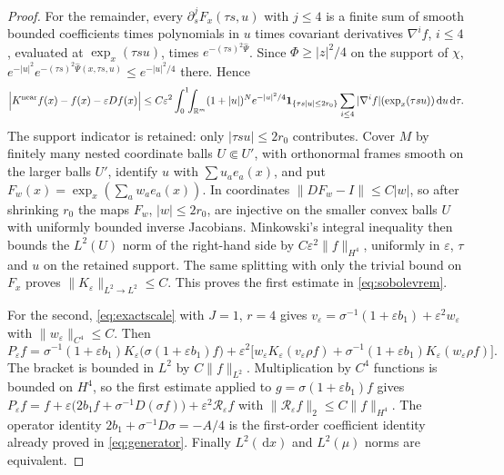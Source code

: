 \documentclass[11pt,a4paper]{article}
\theoremstyle{definition}\newtheorem{definition}[theorem]{Definition}
\theoremstyle{remark}\newtheorem{remark}[theorem]{Remark}
\newcommand{\eps}{\varepsilon}
\newcommand{\dd}{\,\mathrm d}
\newcommand{\R}{\mathbb R}
\newcommand{\norm}[1]{\lVert #1\rVert}
\begin{document}
\begin{proof}
For the remainder, every $\partial_s^jF_x(\tau s,u)$ with $j\le4$ is a finite sum of smooth bounded coefficients times polynomials in $u$ times covariant derivatives $\nabla^if$, $i\le4$, evaluated at $\exp_x(\tau su)$, times $e^{-(\tau s)^2\widehat\Psi}$. Since $\Phi\geq|z|^2/4$ on the support of $\chi$, $e^{-|u|^2}e^{-(\tau s)^2\widehat\Psi(x,\tau s,u)}\leq e^{-|u|^2/4}$ there. Hence
\[
\Bigl|K^{\rm near}f(x)-f(x)-\eps Df(x)\Bigr|\leq C\eps^2\int_0^1\!\!\int_{\R^m}(1+|u|)^Ne^{-|u|^2/4}\mathbf 1_{\{\tau s|u|\le2r_0\}}\sum_{i\le4}|\nabla^if|(\exp_x(\tau su))\dd u\dd\tau.
\]
The support indicator is retained: only $|\tau su|\le2r_0$ contributes. Cover $M$ by finitely many nested coordinate balls $U\Subset U'$, with orthonormal frames smooth on the larger balls $U'$, identify $u$ with $\sum u_ae_a(x)$, and put $F_w(x)=\exp_x(\sum_aw_ae_a(x))$. In coordinates $\norm{DF_w-I}\le C|w|$, so after shrinking $r_0$ the maps $F_w$, $|w|\le2r_0$, are injective on the smaller convex balls $U$ with uniformly bounded inverse Jacobians. Minkowski's integral inequality then bounds the $L^2(U)$ norm of the right-hand side by $C\eps^2\norm f_{H^4}$, uniformly in $\eps$, $\tau$ and $u$ on the retained support. The same splitting with only the trivial bound on $F_x$ proves $\norm{K_\eps}_{L^2\to L^2}\le C$. This proves the first estimate in \eqref{eq:sobolevrem}.

For the second, \eqref{eq:exactscale} with $J=1$, $r=4$ gives $v_\eps=\sigma^{-1}(1+\eps b_1)+\eps^2w_\eps$ with $\norm{w_\eps}_{C^4}\le C$. Then
\[
P_\eps f=\sigma^{-1}(1+\eps b_1)K_\eps\bigl(\sigma(1+\eps b_1)f\bigr)+\eps^2\bigl[w_\eps K_\eps(v_\eps\rho f)+\sigma^{-1}(1+\eps b_1)K_\eps(w_\eps\rho f)\bigr].
\]
The bracket is bounded in $L^2$ by $C\norm f_{L^2}$. Multiplication by $C^4$ functions is bounded on $H^4$, so the first estimate applied to $g=\sigma(1+\eps b_1)f$ gives
$P_\eps f=f+\eps\bigl(2b_1f+\sigma^{-1}D(\sigma f)\bigr)+\eps^2\mathcal R_\eps f$ with $\norm{\mathcal R_\eps f}_2\le C\norm f_{H^4}$. The operator identity $2b_1+\sigma^{-1}D\sigma=-A/4$ is the first-order coefficient identity already proved in \eqref{eq:generator}. Finally $L^2(\dd x)$ and $L^2(\mu)$ norms are equivalent.
\end{proof}
\end{document}
